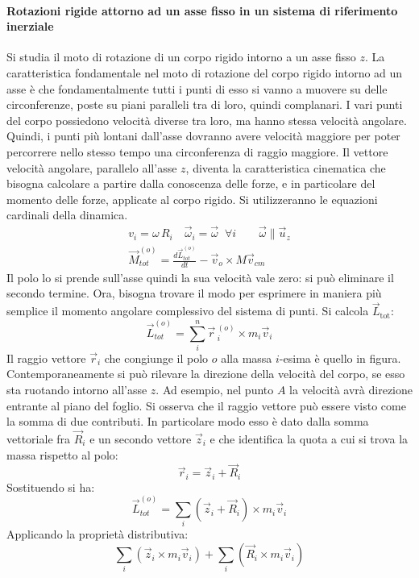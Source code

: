 \documentclass[10pt,a4paper]{book}
\begin{document}
\paragraph{Rotazioni rigide attorno ad un asse fisso in un sistema di riferimento inerziale} Si studia il moto di rotazione di un corpo rigido intorno a un asse fisso $z$. La caratteristica fondamentale nel moto di rotazione del corpo rigido intorno ad un asse è che fondamentalmente tutti i punti di esso si vanno a muovere su delle circonferenze, poste su piani paralleli tra di loro, quindi complanari. I vari punti del corpo possiedono velocità diverse tra loro, ma hanno stessa velocità angolare. Quindi, i punti più lontani dall'asse dovranno avere velocità maggiore per poter percorrere nello stesso tempo una circonferenza di raggio maggiore. Il vettore velocità angolare, parallelo all'asse $z$, diventa la caratteristica cinematica che bisogna calcolare a partire dalla conoscenza delle forze, e in particolare del momento delle forze, applicate al corpo rigido. Si utilizzeranno le equazioni cardinali della dinamica.
\begin{gather*}
	v_i = \omega \, R_i \quad \vec{\omega}_i = \vec{\omega} \;\; \forall i \qquad \vec{\omega} \parallel \vec{u}_z \\
	\vec{M}_{tot}^{(o)} = \frac{ d\vec{L}_{tot}^{(o)}  }{dt} - \vec{v}_o\times M\vec{v}_{cm}
\end{gather*}
Il polo lo si prende sull'asse quindi la sua velocità vale zero: si può eliminare il secondo termine. Ora, bisogna trovare il modo per esprimere in maniera più semplice il momento angolare complessivo del sistema di punti. Si calcola $\vec{L}_\text{tot}$:
\[
	\vec{L}_{tot}^{(o)} = \sum_i^n \vec{r}\,^{(o)}_i \times m_i\vec{v}_i
\]
Il raggio vettore $\vec{r}_i$ che congiunge il polo $o$ alla massa $i$-esima è quello in figura. Contemporaneamente si può rilevare la direzione della velocità del corpo, se esso sta ruotando intorno all'asse $z$. Ad esempio,
nel punto $A$ la velocità avrà direzione entrante al piano del foglio. Si osserva che il raggio vettore può essere visto come la somma di due contributi. In particolare modo esso è dato dalla somma vettoriale fra $\vec{R}_i$ e un secondo vettore $\vec{z}_i$ e che identifica la quota a cui si trova la massa rispetto al polo:
\[
	\vec{r}_i = \vec{z}_i +\vec{R}_i
\]
Sostituendo si ha:
\[
	\vec{L}_{tot}^{(o)} = \sum_i \left( \vec{z}_i+\vec{R}_i\right) \times m_i\vec{v}_i
\]
Applicando la proprietà distributiva:
\[
	\sum_i \left( \vec{z}_i\times m_i\vec{v}_i    \right) + \sum_i \left( \vec{R}_i\times m_i\vec{v}_i \right)
\]
\end{document}
